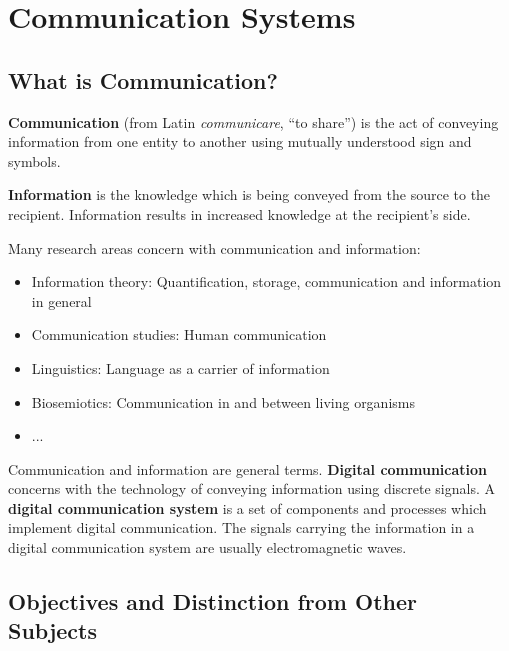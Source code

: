 %
%
%

\chapter{Communication Systems}

\begin{refsection}

\section{What is Communication?}

\textbf{Communication} (from Latin \emph{communicare}, ``to share'') is the act of conveying information from one entity to another using mutually understood sign and symbols.

\textbf{Information} is the knowledge which is being conveyed from the source to the recipient. Information results in increased knowledge at the recipient's side.

Many research areas concern with communication and information:
\begin{itemize}
	\item Information theory: Quantification, storage, communication and information in general
	\item Communication studies: Human communication
	\item Linguistics: Language as a carrier of information
	\item Biosemiotics: Communication in and between living organisms
	\item ...
\end{itemize}

Communication and information are general terms. \textbf{Digital communication} concerns with the technology of conveying information using discrete signals. A \textbf{digital communication system} is a set of components and processes which implement digital communication. The signals carrying the information in a digital communication system are usually electromagnetic waves.


\section{Objectives and Distinction from Other Subjects}


\end{refsection}
